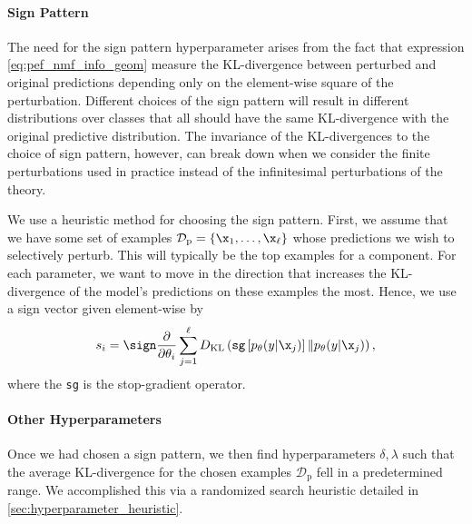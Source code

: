 \documentclass[dvipsnames]{article}
\begin{document}
\paragraph{Sign Pattern}

The need for the sign pattern hyperparameter arises from the fact that expression \eqref{eq:pef_nmf_info_geom} measure the KL-divergence between perturbed and original predictions depending only on the element-wise square of the perturbation.
Different choices of the sign pattern will result in different distributions over classes that all should have the same KL-divergence with the original predictive distribution.
The invariance of the KL-divergences to the choice of sign pattern, however, can break down when we consider the finite perturbations used in practice instead of the infinitesimal perturbations of the theory.

We use a heuristic method for choosing the sign pattern.
First, we assume that we have some set of examples $\mathcal D_\mathrm{p} = \{\x_1,\dotsc,\x_\ell\}$ whose predictions we wish to selectively perturb.
This will typically be the top examples for a component.
For each parameter, we want to move in the direction that increases the KL-divergence of the model's predictions on these examples the most.
Hence, we use a sign vector given element-wise by
\begin{equation}
    s_i = \sign \frac{\partial}{\partial \theta_i}\sum_{j=1}^\ell D_\mathrm{KL}\left(\operatorname{\text{\texttt{sg}}}\left[p_\theta(y|\x_j)\right] \| p_{\theta}(y|\x_j)\right) ,
\end{equation}
where the \texttt{sg} is the stop-gradient operator.

\paragraph{Other Hyperparameters}
Once we had chosen a sign pattern, we then find hyperparameters $\delta,\lambda$ such that the average KL-divergence for the chosen examples $\mathcal D_\mathrm{p}$ fell in a predetermined range.
We accomplished this via a randomized search heuristic detailed in \cref{sec:hyperparameter_heuristic}.
\end{document}

